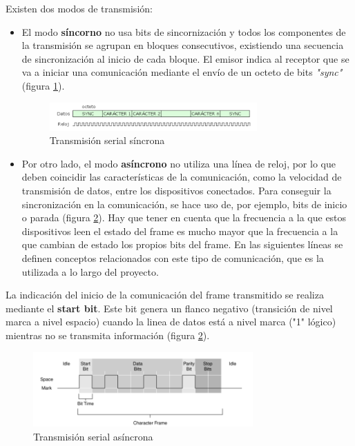 Existen dos modos de transmisión:
\begin{itemize}
\item El modo \textbf{síncorno} no usa bits de sincornización y todos los componentes de la transmisión se agrupan en bloques consecutivos, existiendo una secuencia de sincronización al inicio de cada bloque. El emisor indica al receptor que se va a iniciar una comunicación mediante el envío de un octeto de bits \textit{"sync"} (figura \ref{fig:serialsincrono}).

\begin{figure}[H]
\centering
\includegraphics[width=0.75\textwidth]{figuras/SerialSincrono.png}
\caption{Transmisión serial síncrona}
\label{fig:serialsincrono}
\end{figure}

\item Por otro lado, el modo \textbf{asíncrono} no utiliza una línea de reloj, por lo que deben coincidir las características de la comunicación, como la velocidad de transmisión de datos, entre los dispositivos conectados. Para conseguir la sincronización en la comunicación, se hace uso de, por ejemplo, bits de inicio o parada (figura \ref{fig:serialasincrono}). Hay que tener en cuenta que la frecuencia a la que estos dispositivos leen el estado del frame es mucho mayor que la frecuencia a la que cambian de estado los propios bits del frame. En las siguientes líneas se definen conceptos relacionados con este tipo de comunicación, que es la utilizada a lo largo del proyecto.
\end{itemize}

La indicación del inicio de la comunicación del frame transmitido se realiza mediante el \textbf{start bit}. Este bit genera un flanco negativo (transición de nivel marca a nivel espacio) cuando la linea de datos está a nivel marca ("1" lógico) mientras no se transmita información (figura \ref{fig:serialasincrono}).

\begin{figure}[tb]
\centering
\includegraphics[width=0.75\textwidth]{figuras/SerialAsincrono.png}
\caption{Transmisión serial asíncrona}
\label{fig:serialasincrono}
\end{figure}

